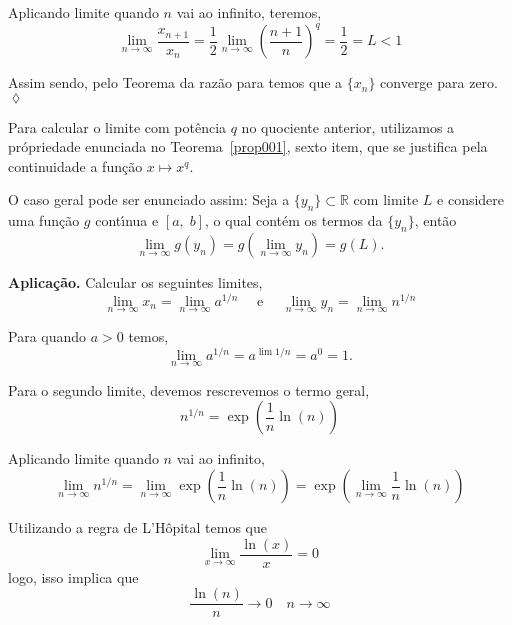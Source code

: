 Aplicando limite quando $n$ vai ao infinito, teremos,
\begin{equation*}
    \lim_{n\to\infty}\frac{x_{n+1}}{x_n}=\frac{1}{2}\lim_{n\to\infty}
    \left(\frac{n+1}{n}\right)^q=\frac{1}{2}=L<1
\end{equation*}

Assim sendo, pelo Teorema da raz\~{a}o para \seqs temos que a \seq $\{x_n\}$ converge para zero.\hfill \(\lozenge\)

\begin{note}
Para calcular o limite com pot\^{e}ncia $q$ no quociente anterior, utilizamos a pr\'{o}priedade enunciada no Teorema~\ref{prop001}, sexto item, que se justifica pela continuidade a fun\c{c}\~{a}o $x\mapsto x^q$.

O caso geral pode ser enunciado assim: Seja a $\{y_n\}\subset \mathbb{R}$ com limite $L$ e considere uma fun\c{c}\~{a}o $g$ cont\'{\i}nua e $[a,\;b]$, o qual cont\'{e}m os termos da \seq $\{y_n\}$, ent\~{a}o
\begin{equation*}
    \lim_{n\to\infty}g(y_n)=g\left(\lim_{n\to\infty}y_n\right)=g(L).
\end{equation*}
\end{note}

\noindent\textbf{Aplica\c{c}\~{a}o.} Calcular os seguintes limites,
\begin{equation*}
    \lim_{n\to\infty}x_n=\lim_{n\to\infty}a^{1/n}\quad \text{ e }\quad 
    \lim_{n\to\infty}y_n=\lim_{n\to\infty}n^{1/n}
\end{equation*}

\solo Para quando $a>0$ temos,
\begin{equation*}
    \lim_{n\to\infty}a^{1/n}=a^{\lim 1/n}=a^0=1.
\end{equation*}

Para o segundo limite, devemos rescrevemos o termo geral,
\begin{equation*}
    n^{1/n}=\exp\left( \frac{1}{n}\ln(n)\right)
\end{equation*}

Aplicando limite quando $n$ vai ao infinito,
\begin{equation*}
    \lim_{n\to\infty}n^{1/n}=\lim_{n\to\infty}\exp\left( \frac{1}{n}\ln(n)\right)=
    \exp\left( \lim_{n\to\infty}\frac{1}{n}\ln(n)\right)
\end{equation*}

Utilizando a regra de L'H\^{o}pital temos que
 \begin{equation*}
    \lim_{x\to\infty}\dfrac{\ln(x)}{x}=0
 \end{equation*}
logo, isso implica que
\begin{equation*}
    \dfrac{\ln(n)}{n}\to 0\quad n\to \infty
\end{equation*}

